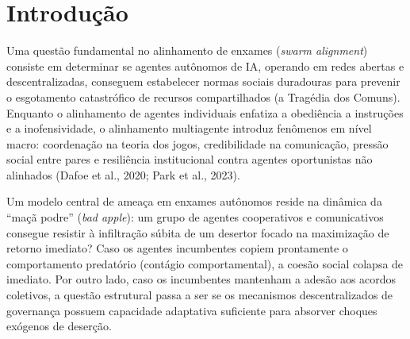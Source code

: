 ﻿\documentclass[11pt,a4paper]{article}
\begin{document}
\section{Introdução}
Uma questão fundamental no alinhamento de enxames (\textit{swarm alignment}) consiste em determinar se agentes autônomos de IA, operando em redes abertas e descentralizadas, conseguem estabelecer normas sociais duradouras para prevenir o esgotamento catastrófico de recursos compartilhados (a Tragédia dos Comuns). Enquanto o alinhamento de agentes individuais enfatiza a obediência a instruções e a inofensividade, o alinhamento multiagente introduz fenômenos em nível macro: coordenação na teoria dos jogos, credibilidade na comunicação, pressão social entre pares e resiliência institucional contra agentes oportunistas não alinhados (Dafoe et al., 2020; Park et al., 2023).

Um modelo central de ameaça em enxames autônomos reside na dinâmica da ``maçã podre'' (\textit{bad apple}): um grupo de agentes cooperativos e comunicativos consegue resistir à infiltração súbita de um desertor focado na maximização de retorno imediato? Caso os agentes incumbentes copiem prontamente o comportamento predatório (contágio comportamental), a coesão social colapsa de imediato. Por outro lado, caso os incumbentes mantenham a adesão aos acordos coletivos, a questão estrutural passa a ser se os mecanismos descentralizados de governança possuem capacidade adaptativa suficiente para absorver choques exógenos de deserção.
\end{document}
